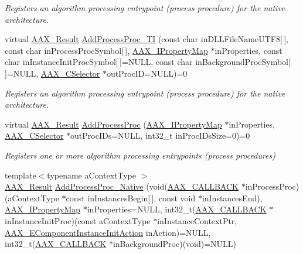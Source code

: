 \begin{DoxyCompactItemize}
\begin{DoxyCompactList}\small\item\em Registers an algorithm processing entrypoint (process procedure) for the native architecture. \end{DoxyCompactList}\item 
virtual \hyperlink{a00149_a4d8f69a697df7f70c3a8e9b8ee130d2f}{A\+A\+X\+\_\+\+Result} \hyperlink{a00088_aa8443e720e48046444a2e9f712f0864b}{Add\+Process\+Proc\+\_\+\+T\+I} (const char in\+D\+L\+L\+File\+Name\+U\+T\+F8\mbox{[}$\,$\mbox{]}, const char in\+Process\+Proc\+Symbol\mbox{[}$\,$\mbox{]}, \hyperlink{a00112}{A\+A\+X\+\_\+\+I\+Property\+Map} $\ast$in\+Properties, const char in\+Instance\+Init\+Proc\+Symbol\mbox{[}$\,$\mbox{]}=N\+U\+L\+L, const char in\+Background\+Proc\+Symbol\mbox{[}$\,$\mbox{]}=N\+U\+L\+L, \hyperlink{a00149_aeaf9b387f902c50a8360ff423f4a1f23}{A\+A\+X\+\_\+\+C\+Selector} $\ast$out\+Proc\+I\+D=N\+U\+L\+L)=0
\begin{DoxyCompactList}\small\item\em Registers an algorithm processing entrypoint (process procedure) for the native architecture. \end{DoxyCompactList}\item 
virtual \hyperlink{a00149_a4d8f69a697df7f70c3a8e9b8ee130d2f}{A\+A\+X\+\_\+\+Result} \hyperlink{a00088_a0e8f6217d0f317c728b3e30f15f181d2}{Add\+Process\+Proc} (\hyperlink{a00112}{A\+A\+X\+\_\+\+I\+Property\+Map} $\ast$in\+Properties, \hyperlink{a00149_aeaf9b387f902c50a8360ff423f4a1f23}{A\+A\+X\+\_\+\+C\+Selector} $\ast$out\+Proc\+I\+Ds=N\+U\+L\+L, int32\+\_\+t in\+Proc\+I\+Ds\+Size=0)=0
\begin{DoxyCompactList}\small\item\em Registers one or more algorithm processing entrypoints (process procedures) \end{DoxyCompactList}\item 
{\footnotesize template$<$typename a\+Context\+Type $>$ }\\\hyperlink{a00149_a4d8f69a697df7f70c3a8e9b8ee130d2f}{A\+A\+X\+\_\+\+Result} \hyperlink{a00088_a38f0d50814689dc720147de1dfd324d2}{Add\+Process\+Proc\+\_\+\+Native} (void(\hyperlink{a00149_aaa22112139aa627574b1ef562f579d43}{A\+A\+X\+\_\+\+C\+A\+L\+L\+B\+A\+C\+K} $\ast$in\+Process\+Proc)(a\+Context\+Type $\ast$const in\+Instances\+Begin\mbox{[}$\,$\mbox{]}, const void $\ast$in\+Instances\+End), \hyperlink{a00112}{A\+A\+X\+\_\+\+I\+Property\+Map} $\ast$in\+Properties=N\+U\+L\+L, int32\+\_\+t(\hyperlink{a00149_aaa22112139aa627574b1ef562f579d43}{A\+A\+X\+\_\+\+C\+A\+L\+L\+B\+A\+C\+K} $\ast$in\+Instance\+Init\+Proc)(const a\+Context\+Type $\ast$in\+Instance\+Context\+Ptr, \hyperlink{a00206_aff5646376a3c93f032cf2400e0885023}{A\+A\+X\+\_\+\+E\+Component\+Instance\+Init\+Action} in\+Action)=N\+U\+L\+L, int32\+\_\+t(\hyperlink{a00149_aaa22112139aa627574b1ef562f579d43}{A\+A\+X\+\_\+\+C\+A\+L\+L\+B\+A\+C\+K} $\ast$in\+Background\+Proc)(void)=N\+U\+L\+L)

\end{DoxyCompactItemize}
